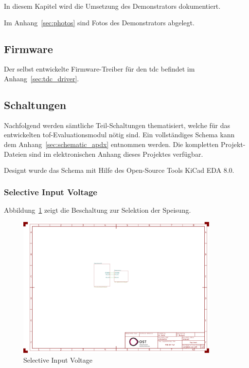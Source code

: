 In diesem Kapitel wird die Umsetzung des Demonstrators dokumentiert.

Im Anhang~\ref{sec:photos} sind Fotos des Demonstrators abgelegt.

\pagebreak

\subsection{Firmware}

Der selbst entwickelte Firmware-Treiber für den \acrshort{tdc} befindet im Anhang~\ref{sec:tdc_driver}.

\pagebreak

\subsection{Schaltungen}
Nachfolgend werden sämtliche Teil-Schaltungen thematisiert, welche für das entwickelten \acrshort{tof}-Evaluationsmodul
nötig sind. Ein vollständiges Schema kann dem Anhang~\ref{sec:schematic_apdx} entnommen werden. Die kompletten
Projekt-Dateien sind im elektronischen Anhang dieses Projektes verfügbar.

Designt wurde das Schema mit Hilfe des Open-Source Tools \dq KiCad EDA 8.0\dq.

\subsubsection{Selective Input Voltage}

Abbildung~\ref{fig:selective_input_voltage} zeigt die Beschaltung zur Selektion der Speisung.

\begin{figure}[H]
    \centering
    \includegraphics[page=2, trim=80 590 750 50, clip, width=0.9\textwidth]{attachments/schematic.pdf}
    \caption{Selective Input Voltage}\label{fig:selective_input_voltage}
\end{figure}

